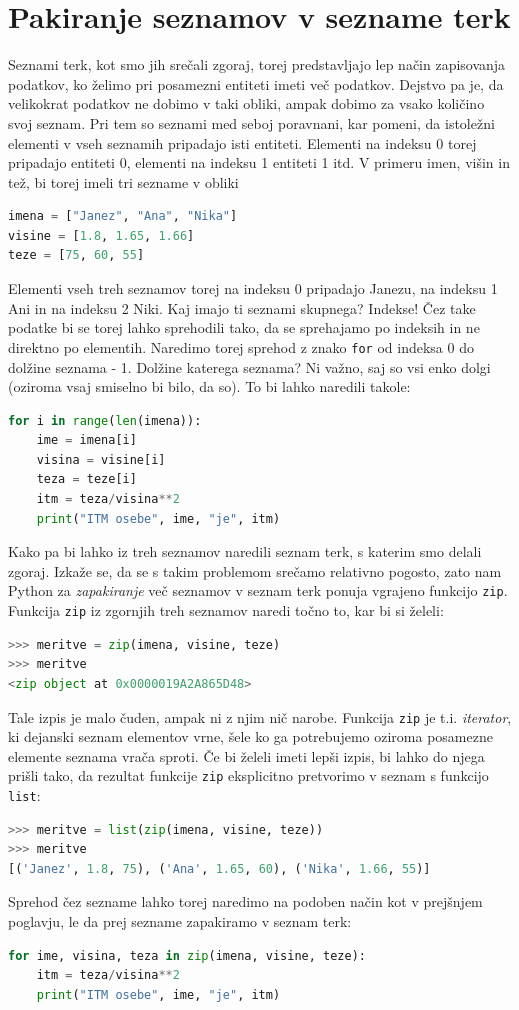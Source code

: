 \section{Pakiranje seznamov v sezname terk}
Seznami terk, kot smo jih srečali zgoraj, torej predstavljajo lep način zapisovanja podatkov, ko želimo pri posamezni entiteti imeti več podatkov. Dejstvo pa je, da velikokrat podatkov ne dobimo v taki obliki, ampak dobimo za vsako količino svoj seznam. Pri tem so seznami med seboj poravnani, kar pomeni, da istoležni elementi v vseh seznamih pripadajo isti entiteti. Elementi na indeksu 0 torej pripadajo entiteti 0, elementi na indeksu 1 entiteti 1 itd. V primeru imen, višin in tež, bi torej imeli tri sezname v obliki 
\begin{lstlisting}[language=Python]
imena = ["Janez", "Ana", "Nika"]
visine = [1.8, 1.65, 1.66]
teze = [75, 60, 55]
\end{lstlisting}
Elementi vseh treh seznamov torej na indeksu 0 pripadajo Janezu, na indeksu 1 Ani in na indeksu 2 Niki. Kaj imajo ti seznami skupnega? Indekse! Čez take podatke bi se torej lahko sprehodili tako, da se sprehajamo po indeksih in ne direktno po elementih. Naredimo torej sprehod z znako \texttt{for} od indeksa 0 do dolžine seznama - 1. Dolžine katerega seznama? Ni važno, saj so vsi enko dolgi (oziroma vsaj smiselno bi bilo, da so). To bi lahko naredili takole:  
\begin{lstlisting}[language=Python]
for i in range(len(imena)):
    ime = imena[i]
    visina = visine[i]
    teza = teze[i]
    itm = teza/visina**2
    print("ITM osebe", ime, "je", itm)
\end{lstlisting}
Kako pa bi lahko iz treh seznamov naredili seznam terk, s katerim smo delali zgoraj. Izkaže se, da se s takim problemom srečamo relativno pogosto, zato nam Python za \emph{zapakiranje} več seznamov v seznam terk ponuja vgrajeno funkcijo \texttt{zip}. Funkcija \texttt{zip} iz zgornjih treh seznamov naredi točno to, kar bi si želeli: 
\begin{lstlisting}[language=Python]
>>> meritve = zip(imena, visine, teze)
>>> meritve
<zip object at 0x0000019A2A865D48>
\end{lstlisting}
Tale izpis je malo čuden, ampak ni z njim nič narobe. Funkcija \texttt{zip} je t.i. \emph{iterator}, ki dejanski seznam elementov vrne, šele ko ga potrebujemo oziroma posamezne elemente seznama vrača sproti. Če bi želeli imeti lepši izpis, bi lahko do njega prišli tako, da rezultat funkcije \texttt{zip} eksplicitno pretvorimo v seznam s funkcijo \texttt{list}:
\begin{lstlisting}[language=Python]
>>> meritve = list(zip(imena, visine, teze))
>>> meritve
[('Janez', 1.8, 75), ('Ana', 1.65, 60), ('Nika', 1.66, 55)]
\end{lstlisting}
Sprehod čez sezname lahko torej naredimo na podoben način kot v prejšnjem poglavju, le da prej sezname zapakiramo v seznam terk:
\begin{lstlisting}[language=Python]
for ime, visina, teza in zip(imena, visine, teze):
    itm = teza/visina**2
    print("ITM osebe", ime, "je", itm)
\end{lstlisting}

